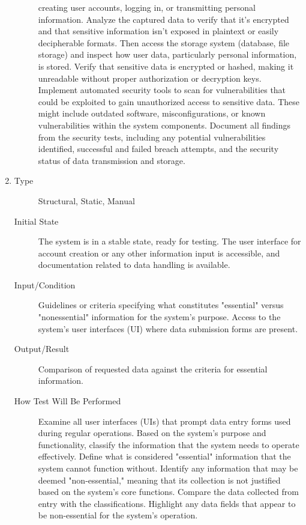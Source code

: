 \documentclass[12pt, titlepage]{article}
\begin{document}
\begin{enumerate}[NFR-T1]
\begin{description}
{    creating user accounts, logging in, or transmitting personal information.
    Analyze the captured data to verify that it's encrypted and that sensitive
    information isn't exposed in plaintext or easily decipherable formats. Then
    access the storage system (database, file storage) and inspect how user
    data, particularly personal information, is stored. Verify that sensitive
    data is encrypted or hashed, making it unreadable without proper
    authorization or decryption keys. Implement automated security tools to scan
    for vulnerabilities that could be exploited to gain unauthorized access to
    sensitive data. These might include outdated software, misconfigurations, or
    known vulnerabilities within the system components. Document all findings
    from the security tests, including any potential vulnerabilities identified,
    successful and failed breach attempts, and the security status of data
    transmission and storage.}
  \end{description}
\item \label{NFRT22}
  \begin{description}
  \item[Type] Structural, Static, Manual
  \item[Initial State] The system is in a stable state, ready for testing. The
    user interface for account creation or any other information input is
    accessible, and documentation related to data handling is available.
  \item[Input/Condition] Guidelines or criteria specifying what constitutes
    "essential" versus "nonessential" information for the system’s purpose.
    Access to the system's user interfaces (UI) where data submission forms are
    present.
  \item[Output/Result] Comparison of requested data against the criteria for
    essential information.
  \item[How Test Will Be Performed] Examine all user interfaces (UIs) that
    prompt data entry forms used during regular operations. Based on the
    system’s purpose and functionality, classify the information that the system
    needs to operate effectively. Define what is considered "essential"
    information that the system cannot function without. Identify any
    information that may be deemed "non-essential," meaning that its collection
    is not justified based on the system’s core functions. Compare the data
    collected from entry with the classifications. Highlight any data fields
    that appear to be non-essential for the system’s operation.

\end{description}
\end{enumerate}
\end{document}
